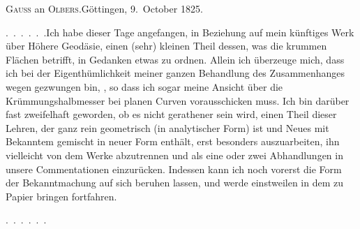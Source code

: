 \begin{center}
\textsc{Gauss} an \textsc{Olbers}.\quad Göttingen, 9.~October 1825.
\end{center}

\par\noindent\hspace*{\parindent}\mbox{.\ .\ .\ .\ .\ .}\quad Ich habe dieser Tage angefangen, in Beziehung auf mein künftiges Werk über Höhere Geodäsie, einen (sehr) kleinen Theil dessen, was die krummen Flächen betrifft, in Gedanken etwas zu ordnen.
Allein ich überzeuge mich, dass ich bei der Eigenthümlichkeit meiner ganzen Behandlung des Zusammenhanges wegen gezwungen bin, , so dass ich sogar meine Ansicht über die Krümmungshalbmesser bei planen Curven vorausschicken muss.
Ich bin darüber fast zweifelhaft geworden, ob es nicht gerathener sein wird, einen Theil dieser Lehren, der ganz rein geometrisch (in analytischer Form) ist und Neues mit Bekanntem gemischt in neuer Form enthält, erst besonders auszuarbeiten, ihn vielleicht von dem Werke abzutrennen und als eine oder zwei Abhandlungen in unsere Commentationen einzurücken.
Indessen kann ich noch vorerst die Form der Bekanntmachung auf sich beruhen lassen, und werde einstweilen in dem zu Papier bringen fortfahren.
\par\nobreak\noindent\hspace*{\parindent}\mbox{.\ .\ .\ .\ .\ .}\par
